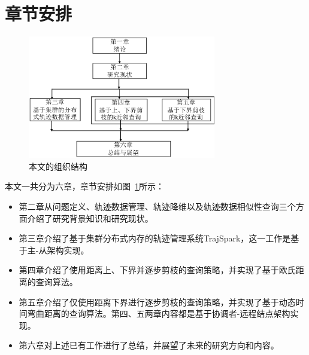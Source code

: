 \section{章节安排}
\begin{figure}
	\centering
	\includegraphics[width=0.73\textwidth]{Fig/chapter1/paperStructure}
	\caption{本文的组织结构}
	\label{fig-chapter1-structure}
\end{figure}
本文一共分为六章，章节安排如图~\ref{fig-chapter1-structure}所示：
\begin{itemize}
	\item 第二章从问题定义、轨迹数据管理、轨迹降维以及轨迹数据相似性查询三个方面介绍了研究背景知识和研究现状。
	\item 第三章介绍了基于集群分布式内存的轨迹管理系统TrajSpark，这一工作是基于主-从架构实现。
	\item 第四章介绍了使用距离上、下界并逐步剪枝的查询策略，并实现了基于欧氏距离的查询算法。
	\item 第五章介绍了仅使用距离下界进行逐步剪枝的查询策略，并实现了基于动态时间弯曲距离的查询算法。第四、五两章内容都是基于协调者-远程结点架构实现。
	\item 第六章对上述已有工作进行了总结，并展望了未来的研究方向和内容。
\end{itemize}

\clearpage
\phantom{s}
\clearpage